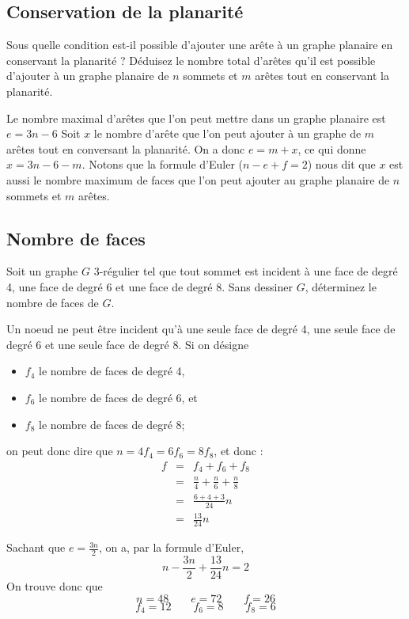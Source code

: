 \subsection{Conservation de la planarité}
Sous quelle condition est-il possible d’ajouter une arête à un graphe planaire en conservant la planarité ? Déduisez le nombre total d’arêtes qu’il est possible d’ajouter à un graphe planaire de $n$ sommets et $m$ arêtes tout en conservant la planarité.

\begin{solution} Le nombre maximal d'arêtes que l'on peut mettre dans un graphe planaire est $e = 3n - 6$ Soit $x$ le nombre d'arête que l'on peut ajouter à un graphe de $m$ arêtes tout en conversant la planarité. On a donc $e = m + x$, ce qui donne $x = 3n - 6 - m$. Notons que la formule d'Euler ($ n - e + f = 2$) nous dit que $x$ est aussi le nombre maximum de faces que l'on peut ajouter au graphe planaire de $n$ sommets et $m$ arêtes. 
\end{solution}

\subsection{Nombre de faces}
Soit un graphe $G$ 3-régulier tel que tout sommet est incident à une face de degré 4, une face de degré 6 et une face de degré 8. Sans dessiner $G$, déterminez le nombre de faces de $G$.

\begin{solution} Un noeud ne peut être incident qu'à une seule face de degré 4, une seule face de degré 6 et une seule face de degré 8. Si on désigne
\begin{itemize}
\item $f_4$ le nombre de faces de degré 4,
\item $f_6$ le nombre de faces de degré 6, et
\item $f_8$ le nombre de faces de degré 8;
\end{itemize}
on peut donc dire que $n = 4f_4 = 6f_6 = 8f_8$, et donc : 
\[  
\begin{array}{rcl}
f &=& f_4 + f_6 + f_8 \\
  &=& \frac{n}{4} + \frac{n}{6} + \frac{n}{8} \\
  &=& \frac{6 + 4 + 3}{24} n \\
  &=& \frac{13}{24} n 
\end{array}
\]

Sachant que $e = \frac{3n}{2}$, on a, par la formule d'Euler, $$ n - \frac{3n}{2} + \frac{13}{24} n = 2 $$
On trouve donc que $$ n = 48 \qquad e = 72 \qquad f = 26$$
$$ f_4 = 12 \qquad f_6 = 8 \qquad f_8 = 6$$
\end{solution}

